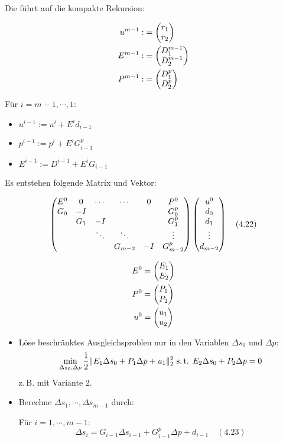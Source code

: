 Die führt auf die kompakte Rekursion:


\begin{align*}
u^{m-1} :&= \begin{pmatrix} r_1 \\ r_2 \end{pmatrix} \\
E^{m-1} :&= \begin{pmatrix} D_1^{m-1} \\ D_2^{m-1} \end{pmatrix} \\
P^{m-1} :&= \begin{pmatrix} D_1^p \\ D_2^p \end{pmatrix} \\
\end{align*}

Für $i=m-1,\cdots,1$:

\begin{itemize}
\item $u^{i-1} := u^i + E^i d_{i-1}$
\item $p^{i-1} := p^i + E^i G_{i-1}^p$
\item $E^{i-1} := D^{i-1} + E^i G_{i-1}$
\end{itemize}

Es entstehen folgende Matrix und Vektor:

\begin{align*}
\begin{pmatrix} E^0 & 0 & \cdots & \cdots & 0 & P^0 \\ G_0 & -I & && & G_0^p \\ & G_1 & -I & && G_1^p \\ & & \ddots & \ddots & & \vdots \\ & & & G_{m-2} & -I & G_{m-2}^p  \end{pmatrix} \begin{pmatrix} u^0 \\ d_0 \\ d_1 \\ \vdots \\ d_{m-2} \end{pmatrix} \quad (4.22)
\end{align*}

\begin{align*}
E^0 &= \begin{pmatrix} E_1 \\ E_2 \end{pmatrix} \\
P^0 &= \begin{pmatrix} P_1 \\ P_2 \end{pmatrix} \\
u^0 &= \begin{pmatrix} u_1 \\ u_2 \end{pmatrix} \\
\end{align*}


\begin{itemize}
\item Löse beschränktes Ausgleichsproblen nur in den Variablen $\Delta s_0$ und $\Delta p$: \[ \min_{\Delta s_0, \Delta p} \frac 12 \| E_1 \Delta s_0 + P_1 \Delta p + u_1 \|_2^2 \text{ s.\,t. } E_2 \Delta s_0 + P_2 \Delta p = 0 \]
z.\,B. mit Variante $2$.
\item Berechne $\Delta s_1,\cdots,\Delta s_{m-1}$ durch:

Für $i=1,\cdots,m-1$:
\[ \Delta s_i = G_{i-1} \Delta s_{i-1} + G_{i-1}^p \Delta p + d_{i-1} \quad (4.23) \]
\end{itemize}

